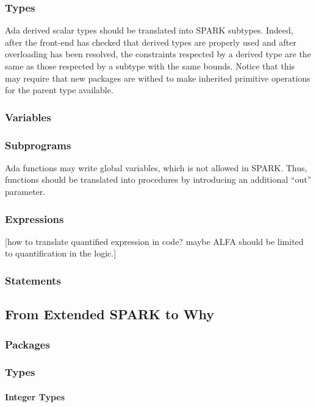 \documentclass{article}
\begin{document}
\subsubsection{Types}

Ada derived scalar types should be translated into SPARK subtypes. Indeed,
after the front-end has checked that derived types are properly used and after
overloading has been resolved, the constraints respected by a derived type are
the same as those respected by a subtype with the same bounds. Notice that this
may require that new packages are withed to make inherited primitive operations
for the parent type available.

\subsubsection{Variables}
\subsubsection{Subprograms}

Ada functions may write global variables, which is not allowed in SPARK. Thus,
functions should be translated into procedures by introducing an additional
``out'' parameter.

\subsubsection{Expressions}

[how to translate quantified expression in code? maybe ALFA should be limited
to quantification in the logic.]

\subsubsection{Statements}

\subsection{From Extended SPARK to Why}

\subsubsection{Packages}
\subsubsection{Types}

\paragraph{Integer Types}
\end{document}

